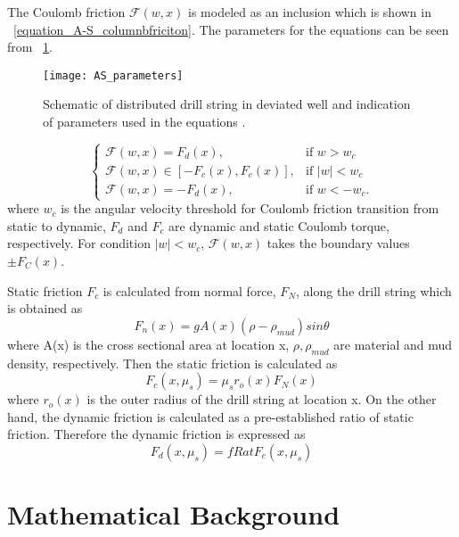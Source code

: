 The Coulomb friction $\mathcal{F}(w,x)$ is modeled as an inclusion which is shown in \equationname~\ref{equation_A-S_columnbfriciton}. The parameters for the equations can be seen from \figurename~\ref{figure_AS_equation_schematic}.
\begin{figure}[!hbt]
  \centering
  \texttt{[image: AS\_parameters]}
  \caption[Schematic of distributed drill string in deviated well]{Schematic of distributed drill string in deviated well and indication of parameters used in the equations \cite{ref:aarsnes2017a}.}\label{figure_AS_equation_schematic}
\end{figure}
\begin{equation}\label{equation_A-S_columnbfriciton}
  \begin{cases}
     \mathcal{F}(w,x) = F_d(x), & \mbox{if } w>w_c \\
     \mathcal{F}(w,x) \in [-F_c(x), F_c(x)], & \mbox{if } |w|<w_c \ \\
     \mathcal{F}(w,x) = -F_d(x), & \mbox{if } w < -w_c.
  \end{cases}
\end{equation}
where $w_c$ is the angular velocity threshold for Coulomb friction transition from static to dynamic, $F_d$ and $F_c$ are dynamic and static Coulomb torque, respectively. For condition $|w|<w_c$, $\mathcal{F}(w,x)$ takes the boundary values $\pm F_C(x)$.

Static friction $F_c$ is calculated from normal force, $F_N$, along the drill string which is obtained as
\begin{equation}\label{equation_AS_normal_force}
  F_n(x) = gA(x)(\rho-\rho_{mud})sin\theta
\end{equation}
where A(x) is the cross sectional area at location x,  $\rho, \rho_{mud}$ are material and mud density, respectively.
Then the static friction is calculated as
\begin{equation}\label{equation_A-S_static_fric}
  F_c(x,\mu_s) = \mu_sr_o(x)F_N(x)
\end{equation}
where $r_o(x)$ is the outer radius of the drill string at location x. 
On the other hand, the dynamic friction is calculated as a pre-established ratio of static friction. Therefore the dynamic friction is expressed as
\begin{equation}\label{equation_A-S_dynamic_fric}
  F_d(x,\mu_s) = fRat F_c(x,\mu_s)
\end{equation}

\section{Mathematical Background}\label{SubSec_AS_mathematicalbackground}
